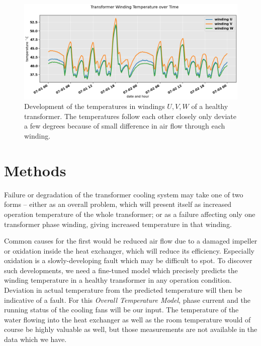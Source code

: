 \documentclass[]{article}
\begin{document}
\begin{figure}[!h]
	\centering
	\includegraphics[width=1\linewidth]{./figs/all-winding-temperature-over-time.png}
	\caption{Development of the temperatures in windings $U,V,W$ of a healthy transformer. The temperatures follow each other closely only deviate a few degrees because of small difference in air flow through each winding.}
	\label{fig:all-winding-temperature-over-time}
\end{figure}


\section{Methods} \label{sec:methods}

Failure or degradation of the transformer cooling system may take one of two forms -- either as an overall problem, which will present itself as increased operation temperature of the whole transformer; or as a failure affecting only one transformer phase winding, giving increased temperature in that winding. 

Common causes for the first would be reduced air flow due to a damaged impeller or oxidation inside the heat exchanger, which will reduce its efficiency. Especially oxidation is a slowly-developing fault which may be difficult to spot. To discover such developments, we need a fine-tuned model which precisely predicts the winding temperature in a healthy transformer in any operation condition. Deviation in actual temperature from the predicted temperature will then be indicative of a fault. For this \textit{Overall Temperature Model}, phase current and the running status of the cooling fans will be our input. The temperature of the water flowing into the heat exchanger as well as the room temperature would of course be highly valuable as well, but those measurements are not available in the data which we have.
\end{document}
